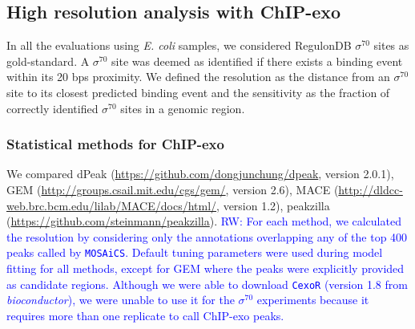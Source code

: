 \documentclass{bmcart}
\newcommand{\RW}[1]{\textcolor{blue}{RW: #1}}
\newcommand{\sig}{\sigma^{70}}
\begin{document}




\subsection*{High resolution analysis with ChIP-exo}

In all the evaluations using \textit{E. coli} samples, we considered
RegulonDB \cite{regulondb} $\sig$ sites as gold-standard. A $\sig$
site was deemed as identified if there exists a binding event within
its 20 bps proximity. We defined the resolution as the distance from
an $\sig$ site to its closest predicted binding event and the
sensitivity as the fraction of correctly identified $\sig$ sites in a
genomic region.

\subsubsection*{Statistical methods for ChIP-exo}

We compared dPeak \cite{dpeak}
(\url{https://github.com/dongjunchung/dpeak}, version 2.0.1), GEM
\cite{gem} (\url{http://groups.csail.mit.edu/cgs/gem/}, version 2.6),
MACE \cite{mace}
(\url{http://dldcc-web.brc.bcm.edu/lilab/MACE/docs/html/}, version
1.2), peakzilla \cite{peakzilla}
(\url{https://github.com/steinmann/peakzilla}). \RW{For each method,
  we calculated the resolution by considering only the annotations
  overlapping any of the top 400 peaks called by
  \texttt{MOSAiCS}. Default tuning parameters were used during model
  fitting for all methods, except for GEM where the peaks were
  explicitly provided as candidate regions. Although we were able to
  download \texttt{CexoR} \cite{cexor} (version 1.8 from
  \emph{bioconductor}), we were unable to use it for the $\sig$
  experiments because it requires more than one replicate to call
  ChIP-exo peaks.}
\end{document}
